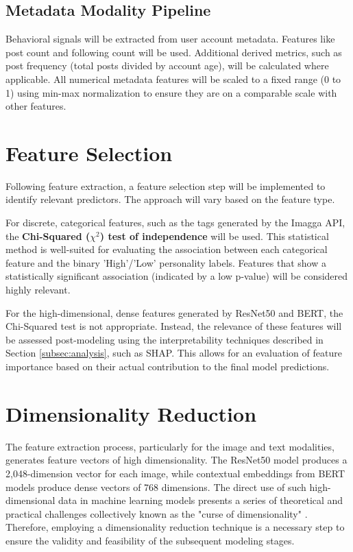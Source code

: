 \subsection{Metadata Modality Pipeline}
Behavioral signals will be extracted from user account metadata. Features like post count and following count will be used. Additional derived metrics, such as post frequency (total posts divided by account age), will be calculated where applicable. All numerical metadata features will be scaled to a fixed range (0 to 1) using min-max normalization to ensure they are on a comparable scale with other features.

\section{Feature Selection}
Following feature extraction, a feature selection step will be implemented to identify relevant predictors. The approach will vary based on the feature type.

For discrete, categorical features, such as the tags generated by the Imagga API, the \textbf{Chi-Squared ($\chi^2$) test of independence} will be used. This statistical method is well-suited for evaluating the association between each categorical feature and the binary 'High'/'Low' personality labels. Features that show a statistically significant association (indicated by a low p-value) will be considered highly relevant.

For the high-dimensional, dense features generated by ResNet50 and BERT, the Chi-Squared test is not appropriate. Instead, the relevance of these features will be assessed post-modeling using the interpretability techniques described in Section \ref{subsec:analysis}, such as SHAP. This allows for an evaluation of feature importance based on their actual contribution to the final model predictions.

\section{Dimensionality Reduction}
\label{sec:rationale_pca}
The feature extraction process, particularly for the image and text modalities, generates feature vectors of high dimensionality. The ResNet50 model produces a 2,048-dimension vector for each image, while contextual embeddings from BERT models produce dense vectors of 768 dimensions. The direct use of such high-dimensional data in machine learning models presents a series of theoretical and practical challenges collectively known as the "curse of dimensionality" \citep{bellman1961, bellman1966}. Therefore, employing a dimensionality reduction technique is a necessary step to ensure the validity and feasibility of the subsequent modeling stages.

